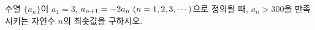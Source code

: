 \hspace*{2mm}\begin{minipage}[t]{\dimexpr\linewidth-2mm\relax}\vspace{0pt}
수열 $\{a_n\}$이 $a_1=3$, $a_{n+1}=-2a_n\ (n=1{,}\mkern3mu\mathopen{}2{,}\mkern3mu\mathopen{}3{,}\mkern3mu\mathopen{}\cdots)$으로 정의될 때, $a_n>300$을 만족시키는 자연수 $n$의 최솟값을 구하시오.\end{minipage}
